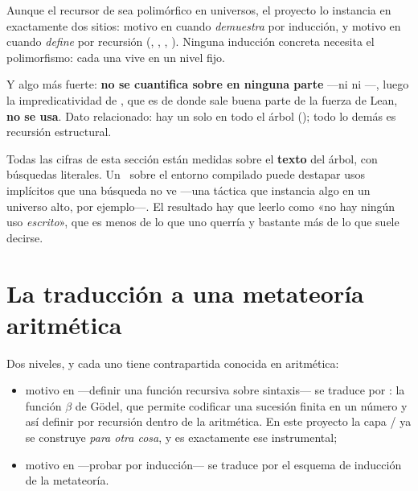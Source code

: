 Aunque el recursor de  sea polimórfico en universos, el proyecto lo instancia en
exactamente dos sitios: motivo en  cuando \emph{demuestra} por inducción, y motivo en
 cuando \emph{define} por recursión (, ,
, ). Ninguna inducción concreta necesita el polimorfismo: cada
una vive en un nivel fijo.

\begin{observacion}
Y algo más fuerte: \textbf{no se cuantifica sobre  en ninguna parte} —ni
 ni —, luego la impredicatividad de , que es de
donde sale buena parte de la fuerza de Lean, \textbf{no se usa}. Dato relacionado: hay un solo
 en todo el árbol (); todo lo
demás es recursión estructural.
\end{observacion}

\begin{muro}
Todas las cifras de esta sección están medidas sobre el \textbf{texto} del árbol, con búsquedas
literales. Un \printaxioms\ sobre el entorno compilado puede destapar usos implícitos que una
búsqueda no ve —una táctica que instancia algo en un universo alto, por ejemplo—. El resultado hay
que leerlo como «no hay ningún uso \emph{escrito}», que es menos de lo que uno querría y bastante
más de lo que suele decirse.
\end{muro}

\section{La traducción a una metateoría aritmética}

Dos niveles, y cada uno tiene contrapartida conocida en aritmética:

\begin{itemize}
\item motivo en  —definir una función recursiva sobre sintaxis— se traduce por
  : la función $\beta$ de Gödel, que permite
  codificar una sucesión finita en un número y así definir por recursión dentro de la aritmética.
  En este proyecto la capa / ya se construye \emph{para otra cosa}, y es
  exactamente ese instrumental;
\item motivo en  —probar por inducción— se traduce por el esquema de inducción de la
  metateoría.
\end{itemize}

